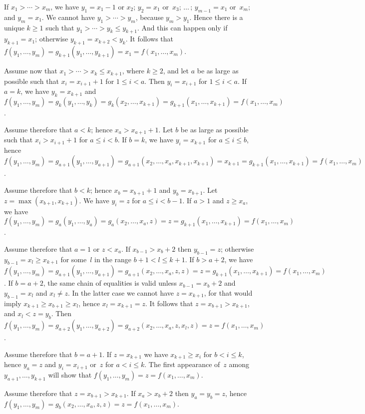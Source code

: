 If $x_1>\cdots >x_m$, we have $y_1=x_1-1$ or $x_2$; $y_2=x_1$ or~$x_3$;
$\ldots\,$; $y_{m-1}=x_1$ or~$x_m$; and $y_m=x_1$. We cannot have
$y_1>\cdots >y_m$, because $y_m>y_1$. Hence there is a unique 
$k\geq 1$ such that $y_1>\cdots >y_k\leq y_{k+1}$. And this can
happen only if $y_{k+1}=x_1$; otherwise $y_{k+1}=x_{k+2}<y_k$.
It follows that $f(y_1,\ldots,y_m)=g_{k+1}(y_1,\ldots,y_{k+1})
=x_1=f(x_1,\ldots,x_m)$.

Assume now that $x_1>\cdots >x_k\leq x_{k+1}$, where $k\geq 2$, and
let $a$ be as large as possible such that $x_i=x_{i+1}+1$ for $1\leq
i<a$. Then $y_i=x_{i+1}$ for $1\leq i<a$. If $a=k$, we have
$y_k=x_{k+1}$ and $f(y_1,\ldots,y_m)=g_k(y_1,\ldots,y_k)=g_k(x_2,\ldots,x_{k+1})=g_{k+1}(x_1,\ldots,x_{k+1})=f(x_1,\ldots,x_m)$.

Assume therefore that $a<k$; hence $x_a>x_{a+1}+1$. Let $b$ be as
large as possible such that $x_i>x_{i+1}+1$ for $a\leq i<b$. 
If $b=k$, we have $y_i=x_{k+1}$ for $a\leq i\leq b$, hence
$f(y_1,\ldots,y_m)=g_{a+1}(y_1,\ldots,y_{a+1})=g_{a+1}(x_2,\ldots,
x_a,x_{k+1},x_{k+1})=x_{k+1}=g_{k+1}(x_1,\ldots,x_{k+1})=
f(x_1,\ldots,x_m)$.

Assume therefore that $b<k$; hence $x_b=x_{b+1}+1$ and $y_b=x_{b+1}$.
Let $z=\max(x_{b+1},x_{k+1})$. We have $y_i=z$ for $a\leq i<b-1$.
If $a>1$ and $z\geq x_a$, we have $f(y_1,\ldots,y_m)=g_a(y_1,\ldots,
y_a)=g_a(x_2,\ldots,x_a,z)=z=g_{k+1}(x_1,\ldots,x_{k+1})=
f(x_1,\ldots,x_m)$.

Assume therefore that $a=1$ or $z<x_a$. If $x_{b-1}>x_b+2$ then
$y_{b-1}=z$; otherwise $y_{b-1}=x_l\geq x_{k+1}$ for some~$l$ in the
range $b+1<l\leq k+1$. If $b>a+2$, we have $f(y_1,\ldots,y_m)=
g_{a+1}(y_1,\ldots,y_{a+1})=g_{a+1}(x_2,\ldots,x_a,z,z)=z=g_{k+1}
(x_1,\ldots,x_{k+1})=f(x_1,\ldots,x_m)$. If $b=a+2$, the same chain
of equalities is valid unless $x_{b-1}=x_b+2$ and $y_{b-1}=x_l$ and
$x_l\not= z$. In the latter case we cannot have $z=x_{k+1}$, for that
would imply $x_{k+1}\geq x_{b+1}\geq x_l$, hence ${x_l=x_{k+1}=z}$.
It follows that $z=x_{b+1}>x_{k+1}$, and $x_l<z=y_b$. Then
$f(y_1,\ldots,y_m)=g_{a+2}(y_1,\ldots,y_{a+2})=g_{a+2}(x_2,\ldots,
x_a,z,x_l,z)=z=f(x_1,\ldots,x_m)$.

Assume therefore that $b=a+1$. If $z=x_{k+1}$ we have $x_{k+1}\geq
x_i$ for $b<i\leq k$, hence $y_a=z$ and $y_i=x_{i+1}$ or~$z$ for
$a<i\leq k$. The first appearance of~$z$ among $y_{a+1},\ldots,
y_{k+1}$ will show that $f(y_1,\ldots,y_m)=z=f(x_1,\ldots,x_m)$.

Assume therefore that $z=x_{b+1}>x_{k+1}$. If $x_a>x_b+2$ then
$y_a=y_b=z$, hence $f(y_1,\ldots,y_m)=g_b(x_2,\ldots,x_a,z,z)
=z=f(x_1,\ldots,x_m)$.

